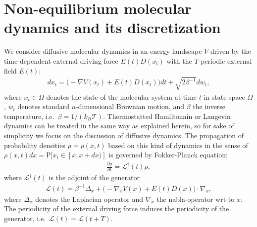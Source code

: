 \documentclass[journal=jctcce,manuscript=article]{achemso}
\newcommand{\vect}[1]{#1}
\newcommand{\ml}[0]{\mathcal {L}}
\newcommand{\prob}{\textrm{P}}
\begin{document}
\section{Non-equilibrium molecular dynamics and its discretization}
\label{sec:disc}
We consider diffusive molecular dynamics in an energy landscape $V$ driven by the time-dependent external driving force $E(t)D(x_t)$ with the
$T$-periodic external field $E(t)$:
\begin{align}
  \label{eq:disc-1}
  d\vect x_t = \Big(-\nabla V(\vect x_t) + E(t) D(\vect x_t)\Big)dt + \sqrt{2\beta^{-1}} d\vect w_t, 
\end{align}
where $x_t\in\Omega$ denotes the state of the molecular system at time $t$ in state space $\Omega$, $\vect w_t$ denotes standard $n$-dimensional Brownian motion, and $\beta$ the inverse temperature,
i.e.~$\beta = 1/(k_B\mathcal T)$.
Thermostatted Hamiltonain or Langevin dynamics can be treated in the same way as explained herein, so for sake of simplicity we focus on the discussion of diffusive dynamics.
The propagation of probability
densities $\rho=\rho(\vect x,t)$ based on this kind of dynamics in the sense
of $\rho(\vect x,t)dx=\prob[\vect x_t\in [\vect x,\vect x+d\vect x)]$ is governed by
Fokker-Planck equation:
\begin{align}
  \label{eq:disc-fp}
  \frac{\partial \rho}{\partial t} = \ml^\dagger(t) \rho,
\end{align}
where $\ml^\dagger(t)$ is the adjoint of the generator
\begin{align}
  \label{eq:disc-3}
  \ml(t)=\beta^{-1}\Delta_{\vect x}+\Big(-\nabla_x V(\vect x) + E(t)D(\vect x)\Big)\cdot\nabla_{\vect x},
\end{align}
where $\Delta_{\vect x}$ denotes the Laplacian operator and $\nabla_{\vect x}$
the nabla-operator wrt to $\vect x$. 
The periodicity of the external driving force induces the periodicity of the generator,
i.e.~$\ml(t) = \ml(t+T)$.  

\end{document}
